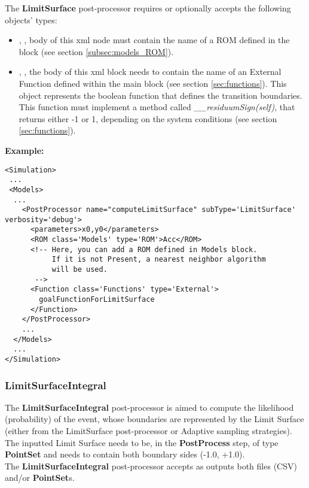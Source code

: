 \begin{itemize}
  The \textbf{LimitSurface} post-processor requires or optionally accepts the
  following objects' types:
   \begin{itemize}
    \item {}, , body of this xml
    node must contain the name of a ROM defined in the  block
    (see section \ref{subsec:models_ROM}).
    \item {}, , the body of
    this xml block needs to contain the name of an External Function defined
    within the  main block (see section \ref{sec:functions}).
    This object represents the boolean function that defines the transition
    boundaries.
    This function must implement a method called
    \textit{\_\_residuumSign(self)}, that returns either -1 or 1, depending on
    the system conditions (see section \ref{sec:functions}).
    \end{itemize}
\end{itemize}

\textbf{Example:}
\begin{lstlisting}[style=XML,morekeywords={name,subType,debug,class,type}]
<Simulation>
 ...
 <Models>
  ...
    <PostProcessor name="computeLimitSurface" subType='LimitSurface' verbosity='debug'>
      <parameters>x0,y0</parameters>
      <ROM class='Models' type='ROM'>Acc</ROM>
      <!-- Here, you can add a ROM defined in Models block.
           If it is not Present, a nearest neighbor algorithm
           will be used.
       -->
      <Function class='Functions' type='External'>
        goalFunctionForLimitSurface
      </Function>
    </PostProcessor>
    ...
  </Models>
  ...
</Simulation>
\end{lstlisting}


\subsubsection{LimitSurfaceIntegral}
\label{LimitSurfaceIntegral}
The \textbf{LimitSurfaceIntegral} post-processor is aimed to compute the likelihood (probability) of the event, whose boundaries are
represented by the Limit Surface (either from the LimitSurface post-processor or Adaptive sampling strategies).
The inputted Limit Surface needs to be, in the  \textbf{PostProcess} step, of type  \textbf{PointSet} and needs to contain
both boundary sides (-1.0, +1.0).
\\ The \textbf{LimitSurfaceIntegral} post-processor accepts as outputs both files (CSV) and/or  \textbf{PointSet}s.

